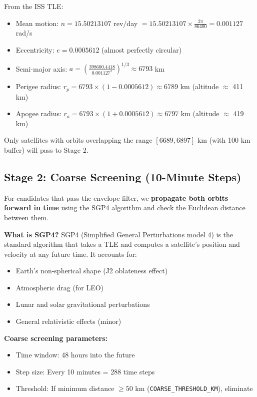 \documentclass[12pt,a4paper]{article}
\begin{document}
\begin{realdatabox}[title=Real Data: ISS Orbital Envelope]
From the ISS TLE:
\begin{itemize}
    \item Mean motion: $n = 15.50213107$ rev/day $= 15.50213107 \times \frac{2\pi}{86400} = 0.001127$ rad/s
    \item Eccentricity: $e = 0.0005612$ (almost perfectly circular)
    \item Semi-major axis: $a = \left(\frac{398600.4418}{0.001127^2}\right)^{1/3} \approx 6793$ km
    \item Perigee radius: $r_p = 6793 \times (1 - 0.0005612) \approx 6789$ km (altitude $\approx$ 411 km)
    \item Apogee radius: $r_a = 6793 \times (1 + 0.0005612) \approx 6797$ km (altitude $\approx$ 419 km)
\end{itemize}
Only satellites with orbits overlapping the range $[6689, 6897]$ km (with 100 km buffer) will pass to Stage 2.
\end{realdatabox}

\subsection{Stage 2: Coarse Screening (10-Minute Steps)}

For candidates that pass the envelope filter, we \textbf{propagate both orbits forward in time} using the SGP4 algorithm and check the Euclidean distance between them.

\textbf{What is SGP4?}
SGP4 (Simplified General Perturbations model 4) is the standard algorithm that takes a TLE and computes a satellite's position and velocity at any future time. It accounts for:
\begin{itemize}
    \item Earth's non-spherical shape (J2 oblateness effect)
    \item Atmospheric drag (for LEO)
    \item Lunar and solar gravitational perturbations
    \item General relativistic effects (minor)
\end{itemize}

\textbf{Coarse screening parameters:}
\begin{itemize}
    \item Time window: 48 hours into the future
    \item Step size: Every 10 minutes = 288 time steps
    \item Threshold: If minimum distance $\geq 50$ km (\texttt{COARSE\_THRESHOLD\_KM}), eliminate
\end{itemize}
\end{document}
